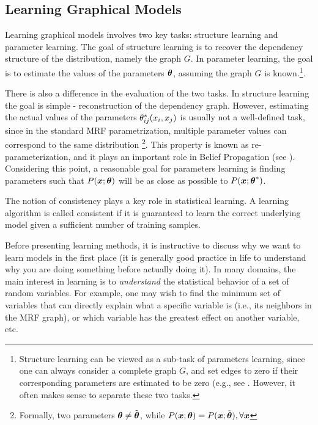 \subsection{Learning Graphical Models}
\label{sec:learning}
Learning graphical models involves two key tasks: structure learning and parameter learning.
 The goal of structure learning is to recover the dependency structure of the distribution, namely the graph $G$. In parameter learning, the goal is to estimate the values of the parameters $\boldsymbol{\theta}$, assuming the graph $G$ is known.\footnote{Structure learning can be viewed as a sub-task of parameters learning, since one can always consider a complete graph $G$, and set edges to zero if their corresponding parameters
 are estimated to be zero (e.g., see . However, it often makes sense to separate these two tasks.}.
 
 
There is also a difference in the evaluation of the two tasks.  In structure learning the goal is simple - reconstruction of the dependency graph. However, estimating the actual values of the parameters ${\theta}^{*}_{ij}(x_i,x_j)$ is usually not a well-defined task, since in the standard MRF parametrization, multiple 
parameter values can correspond to the same distribution \footnote{Formally, two parameters $\boldsymbol{\theta} \neq \tilde{\boldsymbol{\theta}}$, while $P(\boldsymbol{x}; \boldsymbol{\theta}) = P(\boldsymbol{x}; \tilde{\boldsymbol{\theta}}), \forall \boldsymbol{x}$}.
This property is known as re-parameterization, and it plays an important role in Belief Propagation (see ). Considering this point, a reasonable goal for parameters learning is finding parameters such that $P(\boldsymbol{x};\boldsymbol{\theta})$ will be as close as possible to $P(\boldsymbol{x};{\boldsymbol{\theta}}^{*})$. 

The notion of consistency plays a key role in statistical learning. A learning algorithm is called consistent if it is guaranteed to learn the correct underlying model given a sufficient number of 
training samples. 

Before presenting learning methods, it is instructive to discuss why we want to learn models in the first place (it is generally good practice in life to understand why you are doing something before actually doing it). 
In many domains, the main interest in learning is to {\em understand} the statistical behavior of a set of random variables.
For example, one may wish to find the minimum set of variables that can directly explain what a specific variable is (i.e., its neighbors in the MRF graph), or which variable has the greatest effect on another variable, etc.

